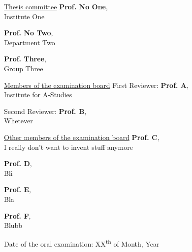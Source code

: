 
\maketitle

\cleardoublepage
\newpage \thispagestyle{empty}
\underline{Thesis committee}
\vskip 2.0mm
\textbf{Prof. No One}, \\
\small Institute One

\vskip 0.05cm
\normalsize \textbf{Prof. No Two}, \\
\small Department Two

\vskip 0.05cm
\normalsize \textbf{Prof. Three}, \\
\small Group Three

\vskip 4.0mm
\normalsize \underline{Members of the examination board}
\vskip 2.0mm
\normalsize First Reviewer: \textbf{Prof. A}, \\
\small Institute for A-Studies

\vskip 0.05cm
\normalsize Second Reviewer: \textbf{Prof. B}, \\
\small Whetever

\vskip 4.0mm
\normalsize \underline{Other members of the examination board}
\vskip 2.0mm
\normalsize \textbf{Prof. C}, \\
\small I really don't want to invent stuff anymore

\vskip 0.05cm
\normalsize \textbf{Prof. D}, \\
\small Bli

\vskip 0.05cm
\normalsize \textbf{Prof. E}, \\
\small Bla

\vskip 0.05cm
\normalsize \textbf{Prof. F}, \\
\small Blubb


\normalsize

\vfill
Date of the oral examination: \hfill XX\textsuperscript{th} of Month, Year

